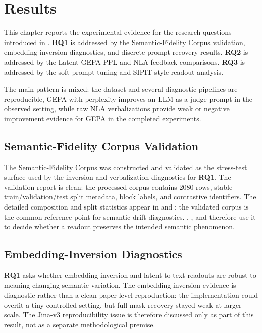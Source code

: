 \documentclass[12pt,a4paper,twoside,openright]{book}
\begin{document}
\chapter{Results}
\label{chapter:results}

This chapter reports the experimental evidence for the research questions
introduced in . \textbf{RQ1} is addressed by the
Semantic-Fidelity Corpus validation, embedding-inversion diagnostics, and
discrete-prompt recovery results. \textbf{RQ2} is addressed by the
Latent-GEPA PPL and NLA feedback comparisons. \textbf{RQ3} is addressed by the
soft-prompt tuning and SIPIT-style readout analysis.

The main pattern is mixed: the dataset and several diagnostic pipelines are
reproducible, GEPA with perplexity improves an LLM-as-a-judge prompt in the
observed setting, while raw NLA verbalizations provide weak or negative
improvement evidence for GEPA in the completed experiments.

\section{Semantic-Fidelity Corpus Validation}
\label{sec:results-canonical-dataset}

The Semantic-Fidelity Corpus was constructed and validated as the stress-test
surface used by the inversion and verbalization diagnostics for \textbf{RQ1}.
The validation report is clean: the
processed corpus contains 2080 rows, stable train/validation/test split
metadata, block labels, and contrastive identifiers. The detailed composition
and split statistics appear in  and
; the validated corpus is the common
reference point for semantic-drift diagnostics.
, ,
and  therefore use it to decide whether a
readout preserves the intended semantic phenomenon.

\section{Embedding-Inversion Diagnostics}
\label{sec:results-embedding-inversion}

\textbf{RQ1} asks whether embedding-inversion and latent-to-text readouts are
robust to meaning-changing semantic variation. The embedding-inversion evidence
is diagnostic rather than a clean paper-level reproduction: the implementation
could overfit a tiny controlled setting, but full-mask recovery stayed weak at
larger scale. The Jina-v3 reproducibility issue is therefore discussed only as
part of this result, not as a separate methodological premise.
\end{document}
